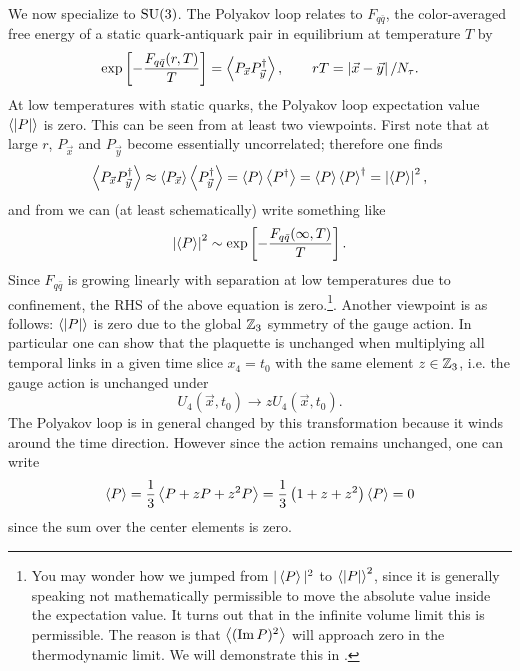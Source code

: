 We now specialize to $\operatorname{SU}(3)$. The Polyakov loop relates to $F_{q\bar{q}}$,
the color-averaged free energy of a static quark-antiquark pair in
equilibrium at temperature $T$ by
\cite{mclerran_monte_1981,mclerran_quark_1981}
\begin{equation}\label{eq:Fav}
  \exp\left[-\frac{F_{q\bar{q}}(r,T)}{T}\right] 
    =\ev{P_{\vec{x}}P^\dagger_{\vec{y}}},
     \qquad rT=\left|\vec{x}-\vec{y}\tinysp\right|/N_\tau.
\end{equation}
At low temperatures with static quarks, the Polyakov loop expectation value
$\ev{|P|}$ is zero. This can be seen from at least two viewpoints. First
note that at large $r$, $P_{\vec{x}}$ and $P_{\vec{y}}$ become essentially
uncorrelated; therefore one finds
\begin{equation}\label{eq:ploop_decouple}
  \ev{P_{\vec{x}}P^\dagger_{\vec{y}}}
    \approx\ev{P_{\vec{x}}}\ev{P^\dagger_{\vec{y}}}
    =\ev{P}\ev{P^\dagger}
    =\ev{P}\ev{P}^\dagger
    =\left|\ev{P}\right|^2,
\end{equation}
and from  we can (at least schematically) write
something like
\begin{equation}
  \left|\ev{P}\right|^2\sim\exp\left[-\frac{F_{q\bar{q}}(\infty,T)}{T}\right]. 
\end{equation}
Since $F_{q\bar{q}}$ is growing linearly with separation at low temperatures
due to confinement, the RHS of the above equation is zero.\footnote{You may
wonder how we jumped from $|\ev{P}|^2$ to $\ev{|P|}^2$, since it is generally
speaking not mathematically permissible to move the absolute value inside the
expectation value. It turns out that in the infinite volume limit this is
permissible. The reason is that $\ev{(\Im P)^2}$
will approach zero in the thermodynamic limit. We
will demonstrate this in .}.
Another viewpoint is as follows: $\ev{|P|}$ is zero due to the global
$\mathbb{Z}_3$ symmetry of the gauge action. In particular one can show
that the plaquette is unchanged when multiplying all temporal links in a
given time slice $x_4=t_0$ with the same element $z\in\mathbb{Z}_3$, i.e.
the gauge action is unchanged under
\begin{equation}
  U_4(\vec{x},t_0)\to zU_4(\vec{x},t_0).
\end{equation}
The Polyakov loop is in general changed by this transformation
because it winds around the time direction. However since the action remains
unchanged, one can write
\begin{equation}\label{eq:centerzero}
  \ev{P}=\frac{1}{3}\ev{P+zP+z^2P}=\frac{1}{3}\left(1+z+z^2\right)\ev{P}=0
\end{equation}
since the sum over the center elements is zero.

